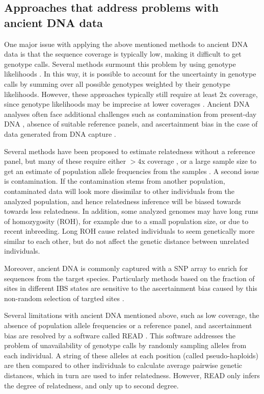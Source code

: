\documentclass[12pt, letterpaper]{article}
\begin{document}
\subsection{Approaches that address problems with ancient DNA data}
One major issue with applying the above mentioned methods to ancient DNA data is that the sequence coverage is typically low, making it difficult to get genotype calls.
Several methods surmount this problem by using genotype likelihoods \cite{lipatov_maximum_2015,korneliussen_ngsrelate_2015}. In this way, it is possible to account for the uncertainty in genotype calls by summing over all possible genotypes weighted by their genotype likelihoods. However, these approaches typically still require at least 2x coverage, since genotype likelihoods may be imprecise at lower coverages \cite{korneliussen_angsd_2014} . Ancient DNA analyses often face additional challenges such as contamination from present-day DNA \cite{peyregne_present-day_2020-1}, absence of suitable reference panels, and ascertainment bias in the case of data generated from DNA capture \cite{prufer_computational_2010, vai_kinship_2020}.

Several methods have been proposed to estimate relatedness without a reference panel, but many of these require either $>4$x coverage \cite{waples_allele_2019}, or a large sample size to get an estimate of population allele frequencies from the samples \cite{theunert_joint_2017}. A second issue is contamination. If the contamination stems from another population, contaminated data will look more dissimilar to other individuals from the analyzed population, and hence relatedness inference will be biased towards towards less relatedness.  In addition, some analyzed  genomes  may have long runs of homozygosity (ROH), for example due to a small population size, or due to recent inbreeding. Long ROH cause related individuals to seem genetically more similar to each other, but do not affect the genetic distance between unrelated individuals.

Moreover, ancient DNA is commonly captured with a SNP array to enrich for sequences from the target species. Particularly methods based  on the fraction of sites in different IBS states are sensitive to the ascertainment bias caused by this non-random selection of targted sites \cite{waples_allele_2019}. 

Several limitations with ancient DNA mentioned above, such as low coverage, the absence of population allele frequencies or a reference panel, and ascertainment bias are resolved by a software called READ \cite{kuhn_estimating_2018}. This software addresses the problem of unavailability of genotype calls by randomly sampling alleles from each individual. A string of these alleles at each position (called pseudo-haploids) are then compared to other individuals to calculate average pairwise genetic distances, which in turn are used to infer relatedness. However, READ only infers the degree of relatedness, and only up to second degree.
\end{document}

